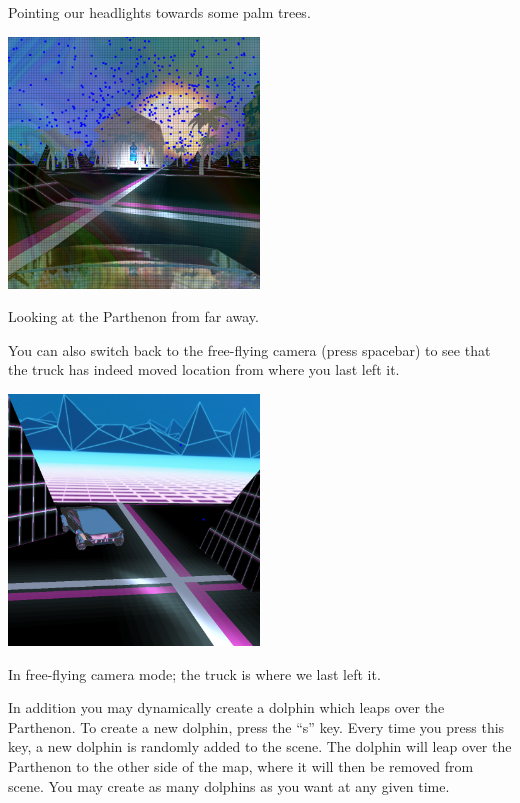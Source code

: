 \documentclass[10pt,letterpaper,oneside]{article}
\numberwithin{equation}{section}		%
\numberwithin{figure}{section}			%
\numberwithin{table}{section}				%
\begin{document}
\begin{center}
    Pointing our headlights towards some palm trees.
    
    \includegraphics[width=0.5\textwidth]{truck4.png}
    
    Looking at the Parthenon from far away.
\end{center}

You can also switch back to the free-flying camera (press spacebar) to see that the truck has indeed moved location from where you last left it.

\begin{center}
    \includegraphics[width=0.5\textwidth]{moved.png}
    
    In free-flying camera mode; the truck is where we last left it.
\end{center}

In addition you may dynamically create a dolphin which leaps over the Parthenon. To create a new dolphin, press the ``s'' key. Every time you press this key, a new dolphin is randomly added to the scene. The dolphin will leap over the Parthenon to the other side of the map, where it will then be removed from scene. You may create as many dolphins as you want at any given time.
\end{document}
